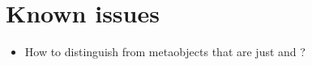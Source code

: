 \section{Known issues}

\begin{itemize}
\item How to distinguish  from metaobjects that are just  and  ?

\end{itemize}
